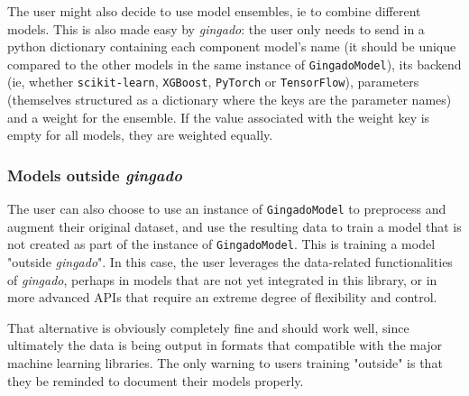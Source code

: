 \documentclass{article}
\begin{document}
The user might also decide to use model ensembles, ie to combine different models. This is also made easy by \textit{gingado}: the user only needs to send in a python dictionary containing each component model's name (it should be unique compared to the other models in the same instance of \texttt{GingadoModel}), its backend (ie, whether \texttt{scikit-learn}, \texttt{XGBoost}, \texttt{PyTorch} or \texttt{TensorFlow}), parameters (themselves structured as a dictionary where the keys are the parameter names) and a weight for the ensemble. If the value associated with the weight key is empty for all models, they are weighted equally.

\subsubsection{Models outside \textit{gingado}}\label{outside}

The user can also choose to use an instance of \texttt{GingadoModel} to preprocess and augment their original dataset, and use the resulting data to train a model that is not created as part of the instance of \texttt{GingadoModel}. This is training a model "outside \textit{gingado}". In this case, the user leverages the data-related functionalities of \textit{gingado}, perhaps in models that are not yet integrated in this library, or in more advanced APIs that require an extreme degree of flexibility and control.

That alternative is obviously completely fine and should work well, since ultimately the data is being output in formats that compatible with the major machine learning libraries. The only warning to users training "outside" is that they be reminded to document their models properly.





\end{document}
